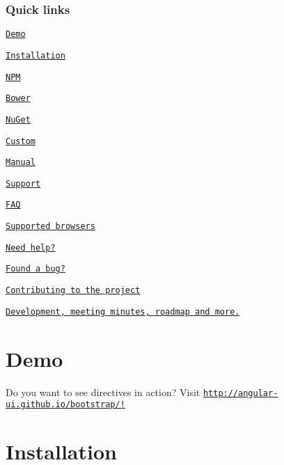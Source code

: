 \href{https://gitter.im/angular-ui/bootstrap?utm_source=badge&utm_medium=badge&utm_campaign=pr-badge&utm_content=badge}{\tt } \href{http://travis-ci.org/angular-ui/bootstrap}{\tt } \href{https://david-dm.org/angular-ui/bootstrap#info=devDependencies}{\tt }

\subsubsection*{Quick links}


\begin{DoxyItemize}
\item \href{#demo}{\tt Demo}
\item \href{#installation}{\tt Installation}
\begin{DoxyItemize}
\item \href{#install-with-npm}{\tt N\+PM}
\item \href{#install-with-bower}{\tt Bower}
\item \href{#install-with-nuget}{\tt Nu\+Get}
\item \href{#custom-build}{\tt Custom}
\item \href{#manual-download}{\tt Manual}
\end{DoxyItemize}
\item \href{#support}{\tt Support}
\begin{DoxyItemize}
\item \href{#faq}{\tt F\+AQ}
\item \href{#supported-browsers}{\tt Supported browsers}
\item \href{#need-help}{\tt Need help?}
\item \href{#found-a-bug}{\tt Found a bug?}
\end{DoxyItemize}
\item \href{#contributing-to-the-project}{\tt Contributing to the project}
\item \href{#development-meeting-minutes-roadmap-and-more}{\tt Development, meeting minutes, roadmap and more.}
\end{DoxyItemize}

\section*{Demo}

Do you want to see directives in action? Visit \href{http://angular-ui.github.io/bootstrap/!}{\tt http\+://angular-\/ui.\+github.\+io/bootstrap/!}

\section*{Installation}

